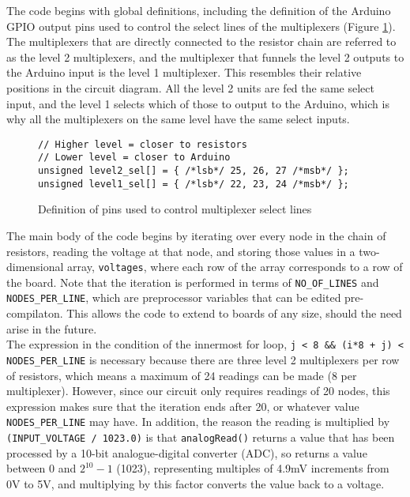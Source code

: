
The code begins with global definitions, including the definition of the Arduino GPIO output pins used to  control the select lines of the multiplexers (Figure \ref{lst:mux_sel}). The multiplexers that are directly connected to the resistor chain are referred to as the level 2 multiplexers, and the multiplexer that funnels the level 2 outputs to the Arduino input is the level 1 multiplexer. This resembles their relative positions in the circuit diagram. All the level 2 units are fed the same select input, and the level 1 selects which of those to output to the Arduino, which is why all the multiplexers on the same level have the same select inputs.

\begin{figure}[H]
\centering
\begin{verbatim}
// Higher level = closer to resistors
// Lower level = closer to Arduino
unsigned level2_sel[] = { /*lsb*/ 25, 26, 27 /*msb*/ }; 
unsigned level1_sel[] = { /*lsb*/ 22, 23, 24 /*msb*/ };
\end{verbatim}
\caption{Definition of pins used to control multiplexer select lines }
\label{lst:mux_sel}
\end{figure}

The main body of the code begins by iterating over every node in the chain of resistors, reading the voltage at that node, and storing those values in a two-dimensional array, \texttt{voltages}, where each row of the array corresponds to a row of the board. Note that the iteration is performed in terms of \texttt{NO\_OF\_LINES} and \texttt{NODES\_PER\_LINE}, which are preprocessor variables that can be edited pre-compilaton. This allows the code to extend to boards of any size, should the need arise in the future. \\

The expression in the condition of the innermost for loop, \texttt{j < 8 \&\& (i*8 + j) < NODES\_PER\_LINE} is necessary because there are three level 2 multiplexers per row of resistors, which means a maximum of 24 readings can be made (8 per multiplexer). However, since our circuit only requires readings of 20 nodes, this expression makes sure that the iteration ends after 20, or whatever value \texttt{NODES\_PER\_LINE} may have. In addition, the reason the reading is multiplied by \texttt{(INPUT\_VOLTAGE / 1023.0)} is that \texttt{analogRead()} returns a value that has been processed by a 10-bit analogue-digital converter (ADC), so returns a value between 0 and $2^{10}-1$ (1023), representing multiples of 4.9mV increments from 0V to 5V, and multiplying by this factor converts the value back to a voltage.

